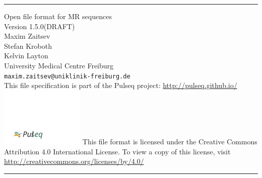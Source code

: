 \documentclass{article}
\date{}
\author{}
\def\myversionmajor{1}
\def\myversionminor{5}
\def\myversionrevision{0}
\def\myversion{\myversionmajor.\myversionminor.\myversionrevision }
\begin{document}
\begin{titlepage}
\begin{centering}
\rule{\textwidth}{5pt}\vskip1cm
\Huge{Open file format for MR sequences \\}
\vspace{1cm}
\LARGE{Version \myversion (DRAFT)\\}
\vspace{1cm}
\large Maxim Zaitsev\\ Stefan Kroboth\\ Kelvin Layton\\ 
\vspace{1cm}
\large University Medical Centre Freiburg \\%
 \verb+maxim.zaitsev@uniklinik-freiburg.de+\\%
 \vspace{1cm}
 This file specification is part of the Pulseq project:
 \vspace{0.5cm}
 \url{http://pulseq.github.io/}\\
 \href{http://pulseq.github.io/}{\includegraphics[width=0.3\textwidth]{logo}}
 \vfill
\small This file format is licensed under the Creative Commons Attribution 4.0 International License. To view a copy of this license, visit \url{ http://creativecommons.org/licenses/by/4.0/ }\\
\rule{\textwidth}{5pt}
\end{centering}
\end{titlepage}

\newpage

\setlength\parindent{0pt}
\setlength{\parskip}{0.4\baselineskip}%

\tableofcontents

\setlength\parindent{0pt}
\setlength{\parskip}{\baselineskip}%

\newpage
\end{document}
